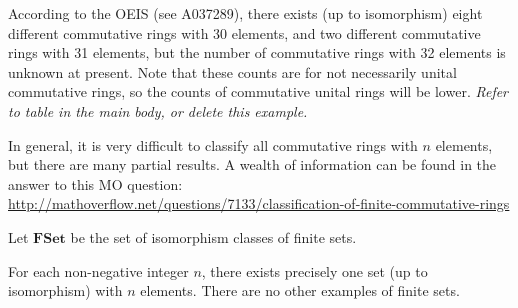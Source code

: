 \begin{example}
According to the OEIS (see A037289), there exists (up to isomorphism) eight different commutative rings with 30 elements, and two different commutative rings with 31 elements, but the number of commutative rings with 32 elements is unknown at present. Note that these counts are for not necessarily unital commutative rings, so the counts of commutative unital rings will be lower. \emph{Refer to table in the main body, or delete this example.}
\end{example}

In general, it is very difficult to classify all commutative rings with $n$ elements, but there are many partial results. A wealth of information can be found in the answer to this MO question:
\url{http://mathoverflow.net/questions/7133/classification-of-finite-commutative-rings}



\begin{definition}
Let $\mathbf{FSet}$ be the set of isomorphism classes of finite sets.
\end{definition}

\begin{example}
For each non-negative integer $n$, there exists precisely one set (up to isomorphism) with $n$ elements. There are no other examples of finite sets.
\end{example}










